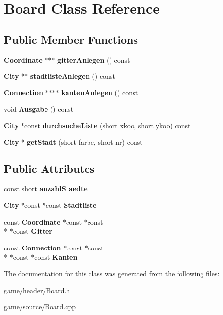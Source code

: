 \section{Board Class Reference}
\label{class_board}
\subsection*{Public Member Functions}
\begin{DoxyCompactItemize}
\item 
{\bf Coordinate} $\ast$$\ast$$\ast$ {\bfseries gitter\-Anlegen} () const \label{class_board_a4dc36c54ace7643e944d7a1c22489290}

\item 
{\bf City} $\ast$$\ast$ {\bfseries stadtliste\-Anlegen} () const \label{class_board_a673546f9b873b889391d4f5f00c8e11e}

\item 
{\bf Connection} $\ast$$\ast$$\ast$$\ast$ {\bfseries kanten\-Anlegen} () const \label{class_board_ad183860652e0761149da102dde1ed9d3}

\item 
void {\bfseries Ausgabe} () const \label{class_board_a027a9e9004d0d813a462deac6fc43762}

\item 
{\bf City} $\ast$const {\bfseries durchsuche\-Liste} (short xkoo, short ykoo) const \label{class_board_a3050c3b7275b6c71e0d03566d4e05d46}

\item 
{\bf City} $\ast$ {\bfseries get\-Stadt} (short farbe, short nr) const \label{class_board_a503bfdd2977525b7e660681bd5103900}

\end{DoxyCompactItemize}
\subsection*{Public Attributes}
\begin{DoxyCompactItemize}
\item 
const short {\bfseries anzahl\-Staedte}\label{class_board_af2f4b0e66fc22947fffc5d35557562bf}

\item 
{\bf City} $\ast$const $\ast$const {\bfseries Stadtliste}\label{class_board_a2dbb7565fffccb8319092b9f07c24db9}

\item 
const {\bf Coordinate} $\ast$const $\ast$const \\*
$\ast$const {\bfseries Gitter}\label{class_board_a4c2e87dffb506647f972d8104b6051cb}

\item 
const {\bf Connection} $\ast$const $\ast$const \\*
$\ast$const $\ast$const {\bfseries Kanten}\label{class_board_a648708bed67ceae1eaa438aa9dd48efb}

\end{DoxyCompactItemize}


The documentation for this class was generated from the following files\-:\begin{DoxyCompactItemize}
\item 
game/header/Board.\-h\item 
game/source/Board.\-cpp\end{DoxyCompactItemize}
